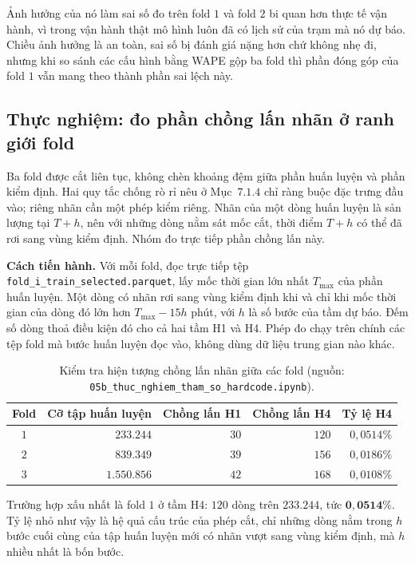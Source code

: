 Ảnh hưởng của nó làm sai số đo trên fold $1$ và fold $2$ bi quan hơn thực tế vận
hành, vì trong vận hành thật mô hình luôn đã có lịch sử của trạm mà nó dự báo. Chiều ảnh
hưởng là an toàn, sai số bị đánh giá nặng hơn chứ không nhẹ đi, nhưng khi so sánh các
cấu hình bằng WAPE gộp ba fold thì phần đóng góp của fold $1$ vẫn mang theo thành phần sai
lệch này.

\FloatBarrier
\subsection{Thực nghiệm: đo phần chồng lấn nhãn ở ranh giới fold}

Ba fold được cắt liên tục, không chèn khoảng đệm giữa phần huấn luyện và phần kiểm
định. Hai quy tắc chống rò rỉ nêu ở Mục~$7.1.4$ chỉ ràng buộc đặc trưng đầu
vào; riêng nhãn cần một phép kiểm riêng. Nhãn của một dòng huấn luyện là sản
lượng tại $T + h$, nên với những dòng nằm sát mốc cắt, thời điểm $T + h$ có thể đã rơi
sang vùng kiểm định. Nhóm đo trực tiếp phần chồng lấn này.

\textbf{Cách tiến hành.} Với mỗi fold, đọc trực tiếp tệp
\texttt{fold\_i\_train\_selected.parquet}, lấy mốc thời gian lớn nhất $T_{\max}$ của phần
huấn luyện. Một dòng có nhãn rơi sang vùng kiểm định khi và chỉ khi mốc thời gian của dòng đó lớn hơn
$T_{\max} - 15h$ phút, với $h$ là số bước của tầm dự báo. Đếm số dòng thoả điều kiện đó
cho cả hai tầm H1 và H4. Phép đo chạy trên chính các tệp fold mà bước huấn luyện đọc
vào, không dùng dữ liệu trung gian nào khác.

\begin{table}[htbp]
\centering
\caption{Kiểm tra hiện tượng chồng lấn nhãn giữa các fold (nguồn: \texttt{05b\_thuc\_nghiem\_tham\_so\_hardcode.ipynb}).}
\label{tab:chong_lan}
\small
\begin{tabular}{c r r r r}
\toprule
\textbf{Fold} & \textbf{Cỡ tập huấn luyện} & \textbf{Chồng lấn H1} & \textbf{Chồng lấn H4} & \textbf{Tỷ lệ H4} \\
\midrule
$1$ & $233.244$ & $30$ & $120$ & $0{,}0514\%$ \\
$2$ & $839.349$ & $39$ & $156$ & $0{,}0186\%$ \\
$3$ & $1.550.856$ & $42$ & $168$ & $0{,}0108\%$ \\
\bottomrule
\end{tabular}
\end{table}

Trường hợp xấu nhất là fold $1$ ở tầm H4: $120$ dòng trên $233.244$, tức
$\mathbf{0{,}0514\%}$. Tỷ lệ nhỏ như vậy là hệ quả cấu trúc của phép cắt, chỉ những dòng
nằm trong $h$ bước cuối cùng của tập huấn luyện mới có nhãn vượt sang vùng kiểm định, mà
$h$ nhiều nhất là bốn bước.

